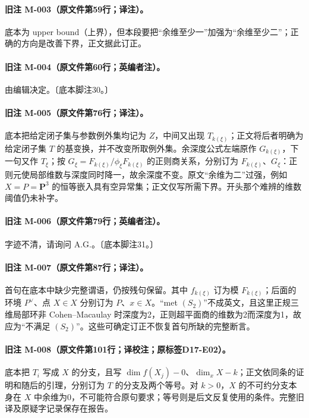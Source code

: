 \documentclass[UTF8,a4paper]{ctexbook}
\begin{document}
\paragraph{旧注 M-003（原文件第59行；译注）。}
底本为 upper bound（上界），但本段要把“余维至少一”加强为“余维至少二”；正确的方向是改善下界，正文据此订正。

\paragraph{旧注 M-004（原文件第60行；英编者注）。}
由编辑决定。〔底本脚注30。〕

\paragraph{旧注 M-005（原文件第76行；译注）。}
底本把给定闭子集与参数例外集均记为 $Z$，中间又出现 $T_{k(\xi)}$；正文将后者明确为给定闭子集 $T$ 的基变换，并不改变所取例外集。余深度公式左端原作 $G_{k(\xi)}$，下一句又作 $T_\xi$；按 $G_\xi=F_{k(\xi)}/\phi_\xi F_{k(\xi)}$ 的正则商关系，分别订为 $F_{k(\xi)}$、$G_\xi$：正则元使局部维数与深度同时降一，故余深度不变。原文“余维为二”过强，例如 $X=P=\mathbf P^3$ 的恒等嵌入具有空异常集；正文仅写所需下界。开头那个难辨的维数阈值仍未补字。

\paragraph{旧注 M-006（原文件第79行；英编者注）。}
字迹不清，请询问 A.G.。〔底本脚注31。〕

\paragraph{旧注 M-007（原文件第87行；译注）。}
首句在底本中缺少完整谓语，仍按残句保留。其中 $f_{k(\xi)}$ 订为模 $F_{k(\xi)}$；后面的环境 $P^\vee$、点 $X\in X$ 分别订为 $P$、$x\in X$。“met $(S_2)$”不成英文，且这里正规三维局部环非 Cohen--Macaulay 时深度为2，正则超平面商的维数为2而深度为1，故应为“不满足 $(S_2)$”。这些可确定订正不恢复首句所缺的完整断言。

\paragraph{旧注 M-008（原文件第101行；译校注；原标签D17-E02）。}
底本把 $T_i$ 写成 $X$ 的分支，且写 $\dim f(X_j)-0$、$\dim_xX-k$；正文依同条的证明和随后的引理，分别订为 $T$ 的分支及两个等号。对 $k>0$，$X$ 的不可约分支本身在 $X$ 中余维为0，不可能符合原句要求；等号则是后文反复使用的条件。完整旧译及原疑字记录保存在报告。
\end{document}
